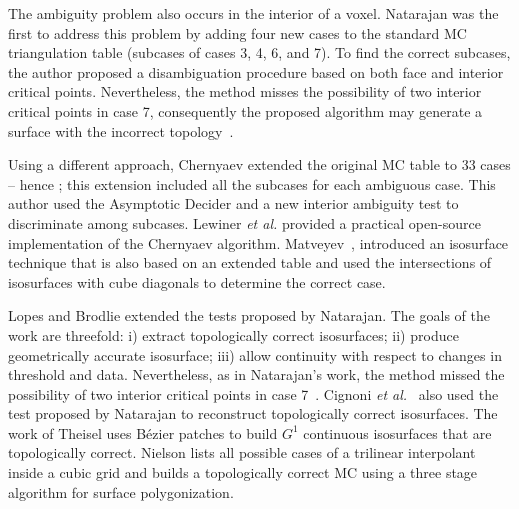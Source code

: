 The ambiguity problem also occurs in the interior of a voxel. Natarajan \cite{Natarajan:1994:GTC:205424.205429}  was the first to address this problem by adding four new cases to the standard MC triangulation table (subcases of cases 3, 4, 6, and 7). To find the correct subcases, the author proposed a disambiguation procedure based on both face and interior critical points. Nevertheless,  the method misses the possibility of two interior critical points in case 7, consequently the proposed algorithm may generate a surface with the incorrect topology~\cite{10.1109/TVCG.2009.10,newman:candg:2006}.

Using a different approach, Chernyaev \cite{Chernyaev95marchingcubes} extended the original MC table to 33 cases -- hence \mc{}; this extension included all the subcases for each ambiguous case. This author used the Asymptotic Decider and a new interior ambiguity test to discriminate among subcases. Lewiner \emph{et al.} \cite{Lewiner:2003} provided a practical open-source implementation of the Chernyaev algorithm.
%
Matveyev~\cite{Matveyev99}, introduced an isosurface technique that is also based on an extended table and used the intersections of isosurfaces with cube diagonals to determine the correct case. 

Lopes and Brodlie \cite{lopes:tvcg:2003} extended the tests proposed by Natarajan. The goals of the work are threefold: i) extract topologically correct isosurfaces; ii) produce geometrically accurate isosurface; iii) allow continuity with respect to changes in threshold and data.  Nevertheless, as in Natarajan's work, the method missed the possibility of two interior critical points in case 7~\cite{lopes:tvcg:2003}.
%
%
Cignoni \emph{et al.}~\cite{Cignoni2000399} also used the test proposed by Natarajan to reconstruct topologically correct isosurfaces.
%
The work of Theisel \cite{CGF:CGF00563} uses B\'ezier patches to build $G^1$ continuous isosurfaces that are topologically correct.  Nielson \cite{10.1109/TVCG.2003.1207437} lists all possible cases of a trilinear interpolant inside a cubic grid and builds a topologically correct MC using a three stage algorithm for surface polygonization. 

